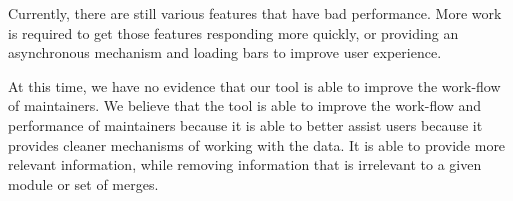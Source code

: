 \documentclass[conference, draftclsnofoot]{IEEEtran}
\begin{document}
Currently, there are still various features that have bad performance. More
work is required to get those features responding more quickly, or providing an
asynchronous mechanism and loading bars to improve user experience.

At this time, we have no evidence that our tool is able to improve the
work-flow of maintainers. We believe that the tool is able to improve the
work-flow and performance of maintainers because it is able to better assist
users because it provides cleaner mechanisms of working with the data. It is
able to provide more relevant information, while removing information that is
irrelevant to a given module or set of merges.
\end{document}
